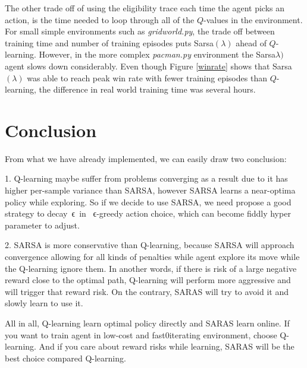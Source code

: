 \documentclass[10pt,conference]{IEEEtran}
\begin{document}
	The other trade off of using the eligibility trace each time the agent 
	picks an action, is the time needed to loop through all of the \(Q\)-values
	in the environment.  For small simple environments such as \textit{gridworld.py},
	the trade off between training time and number of training episodes puts 
	Sarsa\((\lambda)\) ahead of \(Q\)-learning.  However, in the more complex 
	\textit{pacman.py} environment the Sarsa\(\lambda)\) agent slows down 
	considerably.  Even though Figure \ref{winrate} shows that Sarsa\((\lambda)\) 
	was able to reach peak win rate with fewer training episodes than \(Q\)-learning,
	the difference in real world training time was several hours.

\section{Conclusion}
From what we have already implemented, we can easily draw two conclusion:

1. Q-learning maybe suffer from problems converging as a result due to it has higher per-sample variance than SARSA, however SARSA learns a near-optima policy while exploring. So if we decide to use SARSA, we need propose a good strategy to decay ϵ in  ϵ-greedy action choice, which can become fiddly hyper parameter to adjust.

2. SARSA is more conservative than Q-learning, because SARSA will approach convergence allowing for all kinds of penalties while agent explore its move while the Q-learning ignore them. In another words, if there is risk of a large negative reward close to the optimal path, Q-learning will perform more aggressive and will trigger that reward risk. On the contrary, SARAS will try to avoid it and slowly learn to use it.

All in all, Q-learning learn optimal policy directly and SARAS learn online. If you want to train agent in low-cost and fast0iterating environment, choose Q-learning. And if you care about reward risks while learning, SARAS will be the best choice compared Q-learning.

\label{sec:conclusion}



\end{document}

